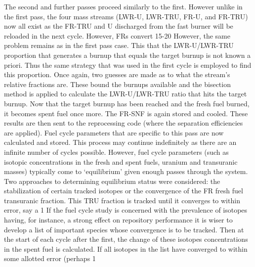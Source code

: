 The second and further passes proceed similarly to the first.  However unlike in the first pass, the four mass streams (LWR-U, LWR-TRU, FR-U, and FR-TRU) now all exist as the FR-TRU and U discharged from the fast burner will be reloaded in the next cycle.  However, FRs convert 15-20%
However, the same problem remains as in the first pass case.  This that the LWR-U/LWR-TRU proportion that generates a burnup that equals the target burnup is not known a priori.  Thus the same strategy that was used in the first cycle is employed to find this proportion.  Once again, two guesses are made as to what the stream’s relative fractions are.  These bound the burnups available and the bisection method is applied to calculate the LWR-U/LWR-TRU ratio that hits the target burnup.  
Now that the target burnup has been reached and the fresh fuel burned, it becomes spent fuel once more.  The FR-SNF is again stored and cooled.  These results are then sent to the reprocessing code (where the separation efficiencies are applied).  Fuel cycle parameters that are specific to this pass are now calculated and stored.
This process may continue indefinitely as there are an infinite number of cycles possible.  However, fuel cycle parameters (such as isotopic concentrations in the fresh and spent fuels, uranium and transuranic masses) typically come to ‘equilibrium’ given enough passes through the system.  Two approaches to determining equilibrium status were considered: the stabilization of certain tracked isotopes or the convergence of the FR fresh fuel transuranic fraction.   This TRU fraction is tracked until it converges to within error, say a 1%
If the fuel cycle study is concerned with the prevalence of isotopes having, for instance, a strong effect on repository performance it is wiser to develop a list of important species whose convergence is to be tracked.  Then at the start of each cycle after the first, the change of these isotopes concentrations in the spent fuel is calculated.  If all isotopes in the list have converged to within some allotted error (perhaps 1%
